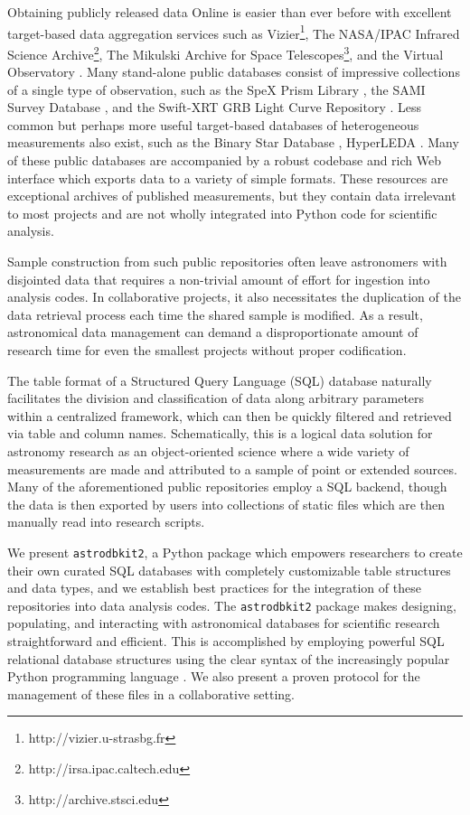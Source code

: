 \documentclass[iop,revtex4,natbib209]{emulateapj}
\begin{document}
Obtaining publicly released data Online is easier than ever before with excellent target-based data aggregation services such as Vizier\footnote{http://vizier.u-strasbg.fr}, The NASA/IPAC Infrared Science Archive\footnote{http://irsa.ipac.caltech.edu}, The Mikulski Archive for Space Telescopes\footnote{http://archive.stsci.edu}, and the Virtual Observatory \citep{Hani14}. Many stand-alone public databases consist of impressive collections of a single type of observation, such as the SpeX Prism Library \citep{Burg14a}, the SAMI Survey Database \citep{Kons15}, and the Swift-XRT GRB Light Curve Repository \citep{Evan07}. Less common but perhaps more useful target-based databases of heterogeneous measurements also exist, such as the Binary Star Database \citep{Kova15}, HyperLEDA \citep{Maka14}. Many of these public databases are accompanied by a robust codebase and rich Web interface which exports data to a variety of simple formats. These resources are exceptional archives of published measurements, but they contain data irrelevant to most projects and are not wholly integrated into Python code for scientific analysis.

Sample construction from such public repositories often leave astronomers with disjointed data that requires a non-trivial amount of effort for ingestion into analysis codes. In collaborative projects, it also necessitates the duplication of the data retrieval process each time the shared sample is modified. As a result, astronomical data management can demand a disproportionate amount of research time for even the smallest projects without proper codification.

The table format of a Structured Query Language (SQL) database naturally facilitates the division and classification of data along arbitrary parameters within a centralized framework, which can then be quickly filtered and retrieved via table and column names. Schematically, this is a logical data solution for astronomy research as an object-oriented science where a wide variety of measurements are made and attributed to a sample of point or extended sources. Many of the aforementioned public repositories employ a SQL backend, though the data is then exported by users into collections of static files which are then manually read into research scripts. 

We present \texttt{astrodbkit2}, a Python package which empowers researchers to create their own curated SQL databases with completely customizable table structures and data types, and we establish best practices for the integration of these repositories into data analysis codes. The \texttt{astrodbkit2} package makes designing, populating, and interacting with astronomical databases for scientific research straightforward and efficient. This is accomplished by employing powerful SQL relational database structures using the clear syntax of the increasingly popular Python programming language \citep{Momc15}. We also present a proven protocol for the management of these files in a collaborative setting.
\end{document}

